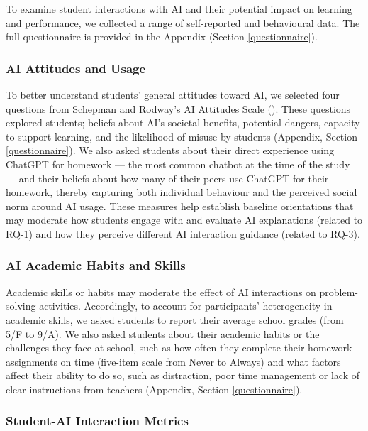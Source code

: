 \documentclass[
  11pt,
]{article}
\begin{document}
To examine student interactions with AI and their potential impact on learning and performance, we collected a range of self-reported and behavioural data. The full questionnaire is provided in the Appendix (Section \ref{questionnaire}).

\subsubsection{AI Attitudes and Usage}\label{ai-attitudes-and-usage}

To better understand students' general attitudes toward AI, we selected four questions from Schepman and Rodway's AI Attitudes Scale (). These questions explored students; beliefs about AI's societal benefits, potential dangers, capacity to support learning, and the likelihood of misuse by students (Appendix, Section \ref{questionnaire}). We also asked students about their direct experience using ChatGPT for homework --- the most common chatbot at the time of the study --- and their beliefs about how many of their peers use ChatGPT for their homework, thereby capturing both individual behaviour and the perceived social norm around AI usage. These measures help establish baseline orientations that may moderate how students engage with and evaluate AI explanations (related to RQ-1) and how they perceive different AI interaction guidance (related to RQ-3).

\subsubsection{AI Academic Habits and Skills}\label{ai-academic-habits-and-skills}

Academic skills or habits may moderate the effect of AI interactions on problem-solving activities. Accordingly, to account for participants' heterogeneity in academic skills, we asked students to report their average school grades (from 5/F to 9/A). We also asked students about their academic habits or the challenges they face at school, such as how often they complete their homework assignments on time (five-item scale from Never to Always) and what factors affect their ability to do so, such as distraction, poor time management or lack of clear instructions from teachers (Appendix, Section \ref{questionnaire}).

\subsubsection{Student-AI Interaction Metrics}\label{student-ai-interaction-metrics}
\end{document}

